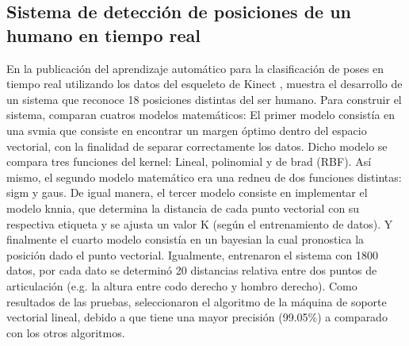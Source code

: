 \subsection{Sistema de detecci\'on de posiciones de un humano en tiempo real} \label{tr:8} 
En la publicaci\'on del aprendizaje autom\'atico para la clasificaci\'on de poses en tiempo real utilizando los datos del esqueleto de Kinect \cite{choubik2016machine}, muestra el desarrollo de un sistema que reconoce 18 posiciones distintas del ser humano.
\medbreak 
Para construir el sistema,   comparan cuatros modelos matem\'aticos: El primer modelo consist\'ia en una \gls{svmia} que consiste en encontrar un margen \'optimo dentro del espacio vectorial, con la finalidad de separar correctamente los datos. Dicho modelo se compara tres funciones del kernel: Lineal, polinomial y de \gls{brad} (RBF). As\'i mismo, el segundo modelo matem\'atico era una \gls{redneu} de dos funciones distintas: \gls{sigm}  y \gls{gaus}. De igual manera, el tercer modelo consiste en implementar el modelo \gls{knnia}, que determina la distancia de cada punto vectorial con su respectiva etiqueta y se ajusta un valor K (seg\'un el entrenamiento de datos). Y finalmente el cuarto modelo consist\'ia en un \gls{bayesian} la cual pronostica la posici\'on dado el punto vectorial.
\medbreak 
Igualmente,  entrenaron el sistema con 1800 datos, por cada dato se determin\'o  20 distancias relativa entre dos puntos de articulaci\'on (e.g. la altura entre codo derecho y hombro derecho).
\medbreak 
Como resultados de las pruebas,   seleccionaron el algoritmo de la m\'aquina de soporte vectorial lineal, debido a que tiene una mayor precisi\'on (99.05\%) a comparado con los otros algoritmos.
